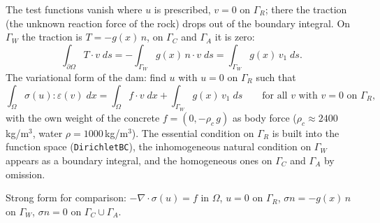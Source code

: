  The test functions vanish where $u$ is prescribed, $v = 0$ on $\Gamma_R$; there the traction (the unknown
reaction force of the rock) drops out of the boundary integral. On $\Gamma_W$ the traction is $T = -g(x)\, n$, on
$\Gamma_C$ and $\Gamma_A$ it is zero:
\[
  \int_{\partial\Omega} T \cdot v \; ds = -\int_{\Gamma_W} g(x)\, n \cdot v \; ds = \int_{\Gamma_W} g(x)\, v_1 \; ds .
\]
The variational form of the dam: find $u$ with $u = 0$ on $\Gamma_R$ such that
\[
  \int_\Omega \sigma(u) : \varepsilon(v) \; dx = \int_\Omega f \cdot v \; dx + \int_{\Gamma_W} g(x)\, v_1 \; ds
  \qquad \text{for all } v \text{ with } v = 0 \text{ on } \Gamma_R ,
\]
with the own weight of the concrete $f = (0, -\rho_c\, g)$ as body force ($\rho_c \approx 2400\,$kg/m$^3$, water
$\rho = 1000\,$kg/m$^3$). The essential condition on $\Gamma_R$ is built into the function space (\texttt{DirichletBC}),
the inhomogeneous natural condition on $\Gamma_W$ appears as a boundary integral, and the homogeneous ones on
$\Gamma_C$ and $\Gamma_A$ by omission.

Strong form for comparison: $-\nabla \cdot \sigma(u) = f$ in $\Omega$, $u = 0$ on $\Gamma_R$,
$\sigma n = -g(x)\, n$ on $\Gamma_W$, $\sigma n = 0$ on $\Gamma_C \cup \Gamma_A$.


